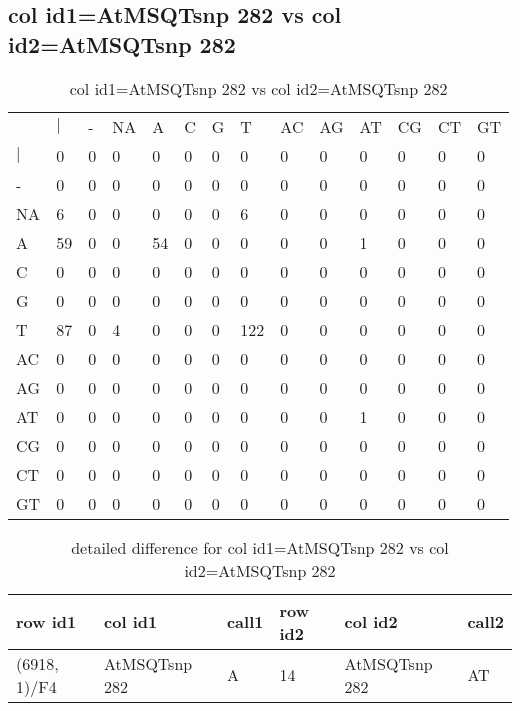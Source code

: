 \subsection{col id1=AtMSQTsnp 282 vs col id2=AtMSQTsnp 282}
\begin{center}
\begin{longtable}{|l|l|l|l|l|l|l|l|l|l|l|l|l|l|}
\caption{col id1=AtMSQTsnp 282 vs col id2=AtMSQTsnp 282} \label{table_dm818}\\
\hline
\\
\hline
&$|$&-&NA&A&C&G&T&AC&AG&AT&CG&CT&GT\\
$|$&0&0&0&0&0&0&0&0&0&0&0&0&0\\
-&0&0&0&0&0&0&0&0&0&0&0&0&0\\
NA&6&0&0&0&0&0&6&0&0&0&0&0&0\\
A&59&0&0&54&0&0&0&0&0&1&0&0&0\\
C&0&0&0&0&0&0&0&0&0&0&0&0&0\\
G&0&0&0&0&0&0&0&0&0&0&0&0&0\\
T&87&0&4&0&0&0&122&0&0&0&0&0&0\\
AC&0&0&0&0&0&0&0&0&0&0&0&0&0\\
AG&0&0&0&0&0&0&0&0&0&0&0&0&0\\
AT&0&0&0&0&0&0&0&0&0&1&0&0&0\\
CG&0&0&0&0&0&0&0&0&0&0&0&0&0\\
CT&0&0&0&0&0&0&0&0&0&0&0&0&0\\
GT&0&0&0&0&0&0&0&0&0&0&0&0&0\\
\hline
\end{longtable}
\end{center}

\begin{center}
\begin{longtable}{|l|l|l|l|l|l|}
\caption{detailed difference for col id1=AtMSQTsnp 282 vs col id2=AtMSQTsnp 282} \label{table_dm819}\\
\hline
row id1&col id1&call1&row id2&col id2&call2\\
\hline
(6918, 1)/F4&AtMSQTsnp 282&A&14&AtMSQTsnp 282&AT\\
\hline
\end{longtable}
\end{center}

